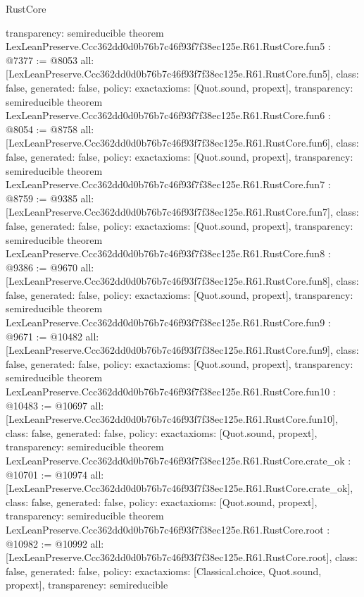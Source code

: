 \begin{lexlean}{RustCore}
\begin{coremodule}
{  transparency: semireducible
}
theorem LexLeanPreserve.Ccc362dd0d0b76b7c46f93f7f38ec125e.R61.RustCore.fun5 : @7377 := @8053 {
  all: [LexLeanPreserve.Ccc362dd0d0b76b7c46f93f7f38ec125e.R61.RustCore.fun5],
  class: false,
  generated: false,
  policy: exact{axioms: [Quot.sound, propext]},
  transparency: semireducible
}
theorem LexLeanPreserve.Ccc362dd0d0b76b7c46f93f7f38ec125e.R61.RustCore.fun6 : @8054 := @8758 {
  all: [LexLeanPreserve.Ccc362dd0d0b76b7c46f93f7f38ec125e.R61.RustCore.fun6],
  class: false,
  generated: false,
  policy: exact{axioms: [Quot.sound, propext]},
  transparency: semireducible
}
theorem LexLeanPreserve.Ccc362dd0d0b76b7c46f93f7f38ec125e.R61.RustCore.fun7 : @8759 := @9385 {
  all: [LexLeanPreserve.Ccc362dd0d0b76b7c46f93f7f38ec125e.R61.RustCore.fun7],
  class: false,
  generated: false,
  policy: exact{axioms: [Quot.sound, propext]},
  transparency: semireducible
}
theorem LexLeanPreserve.Ccc362dd0d0b76b7c46f93f7f38ec125e.R61.RustCore.fun8 : @9386 := @9670 {
  all: [LexLeanPreserve.Ccc362dd0d0b76b7c46f93f7f38ec125e.R61.RustCore.fun8],
  class: false,
  generated: false,
  policy: exact{axioms: [Quot.sound, propext]},
  transparency: semireducible
}
theorem LexLeanPreserve.Ccc362dd0d0b76b7c46f93f7f38ec125e.R61.RustCore.fun9 : @9671 := @10482 {
  all: [LexLeanPreserve.Ccc362dd0d0b76b7c46f93f7f38ec125e.R61.RustCore.fun9],
  class: false,
  generated: false,
  policy: exact{axioms: [Quot.sound, propext]},
  transparency: semireducible
}
theorem LexLeanPreserve.Ccc362dd0d0b76b7c46f93f7f38ec125e.R61.RustCore.fun10 : @10483 := @10697 {
  all: [LexLeanPreserve.Ccc362dd0d0b76b7c46f93f7f38ec125e.R61.RustCore.fun10],
  class: false,
  generated: false,
  policy: exact{axioms: [Quot.sound, propext]},
  transparency: semireducible
}
theorem LexLeanPreserve.Ccc362dd0d0b76b7c46f93f7f38ec125e.R61.RustCore.crate_ok : @10701 := @10974 {
  all: [LexLeanPreserve.Ccc362dd0d0b76b7c46f93f7f38ec125e.R61.RustCore.crate_ok],
  class: false,
  generated: false,
  policy: exact{axioms: [Quot.sound, propext]},
  transparency: semireducible
}
theorem LexLeanPreserve.Ccc362dd0d0b76b7c46f93f7f38ec125e.R61.RustCore.root : @10982 := @10992 {
  all: [LexLeanPreserve.Ccc362dd0d0b76b7c46f93f7f38ec125e.R61.RustCore.root],
  class: false,
  generated: false,
  policy: exact{axioms: [Classical.choice, Quot.sound, propext]},
  transparency: semireducible
}


\end{coremodule}
\end{lexlean}
